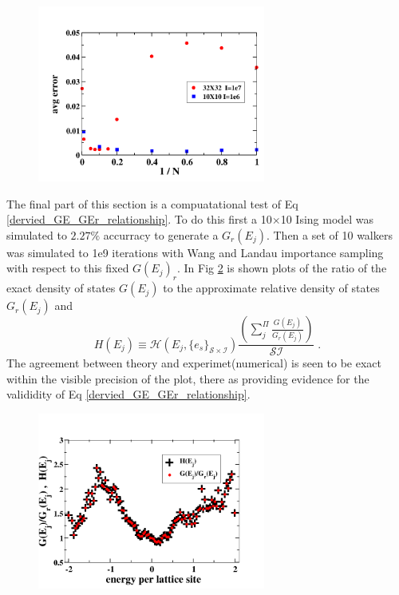 \documentclass[aps,prl,reprint,superscriptaddress,showkeys]{revtex4-1}
\begin{document}
\begin{figure}
\includegraphics[width=7.5cm]{./figures/randN_3232_1010_S100.png}\\
\caption{\label{N_dependence}}
\end{figure}

The final part of this section is a compuatational test of Eq \ref{dervied_GE_GEr_relationship}. To do this first a 10$\times$10 Ising model was simulated to $2.27\%$ accurracy to generate a $G_r(E_j)$. Then a set of 10 walkers was simulated to 1e9 iterations  with Wang and Landau importance sampling with respect to this fixed $G(E_j)_r$. In Fig \ref{GE_GEr_test} is shown plots of the ratio of the exact density of states $G(E_j)$ to the approximate relative density of states $G_r(E_j)$ and 
\begin{equation}
H(E_j) \equiv  \mathcal{H}(E_j,\{e_s\}_{\mathcal{S}\times\mathcal{I}})\frac{(\sum_j^{\Pi}\frac{G(E_j)}{G_r(E_j)})}{\mathcal{S I}}    \;.
\end{equation}
The agreement between theory and experimet(numerical) is seen to be exact within the visible precision of the plot, there as providing evidence for the valididity of Eq \ref{dervied_GE_GEr_relationship}. 

\begin{figure}
\includegraphics[width=7.5cm]{./figures/test_GE_div_Gr.png}
\caption{\label{GE_GEr_test}}
\end{figure}
\end{document}

